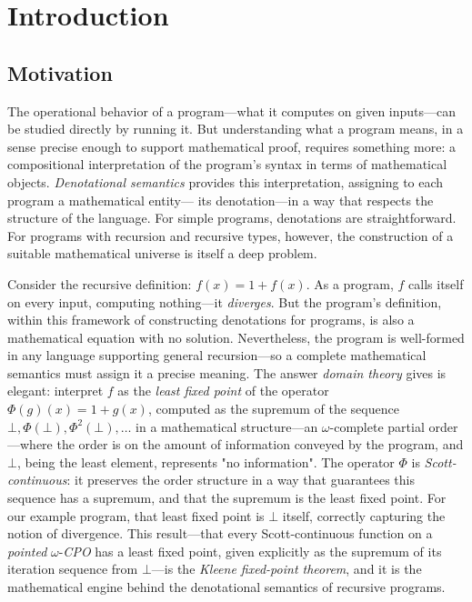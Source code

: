 
\chapter{Introduction}
\label{ch:introduction}

\section{Motivation}
\label{sec:intro-motivation}

The operational behavior of a program---what it computes on given inputs---can be studied directly by running it. 
But understanding what a program means, in a sense precise enough to support mathematical proof, requires 
something more: a compositional interpretation of the program's syntax in terms of mathematical objects. 
\emph{Denotational semantics} provides this interpretation, assigning to each program a mathematical entity---
its denotation---in a way that respects the structure of the language. For simple programs, denotations 
are straightforward. For programs with recursion and recursive types, however, the construction of a suitable 
mathematical universe is itself a deep problem.

Consider the recursive definition: $f(x) = 1 + f(x)$. As a program, $f$ calls 
itself on every input, computing nothing---it \textit{diverges}. But the program's definition, within this framework of constructing denotations for programs, 
is also a mathematical equation with no solution. Nevertheless, the program is well-formed in any language 
supporting general recursion---so a complete mathematical semantics must assign it a precise meaning. The answer \emph{domain theory} 
gives is elegant: interpret $f$ as the \textit{least fixed point} of the operator $\Phi(g)(x) = 1 + g(x)$, 
computed as the supremum of the sequence $\bot, \Phi(\bot), \Phi^{2}(\bot), \ldots$ in a mathematical structure---an 
$\omega$-complete partial order---where the order is on the amount of information conveyed by the program, and $\bot$, 
being the least element, represents "no information". The operator $\Phi$ is \emph{Scott-continuous}: it preserves the 
order structure in a way that guarantees this sequence has a supremum, and that the supremum is the least fixed point. 
For our example program, that least fixed point is $\bot$ itself, correctly capturing the notion of divergence. This 
result---that every Scott-continuous function on a \emph{pointed} $\omega$-\emph{CPO} has a least fixed point, given 
explicitly as the supremum of its iteration sequence from $\bot$---is the \emph{Kleene fixed-point theorem}, and it 
is the mathematical engine behind the denotational semantics of recursive programs.


